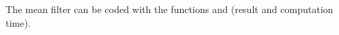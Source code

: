 	\begin{mcomment}
	 \begin{mremark}
	  The mean filter can be coded with the \matlabregistered{} functions  and  (result and computation time).
	 \end{mremark}

	\end{mcomment}

	
% 
% 
% 
% 
% 
% 
